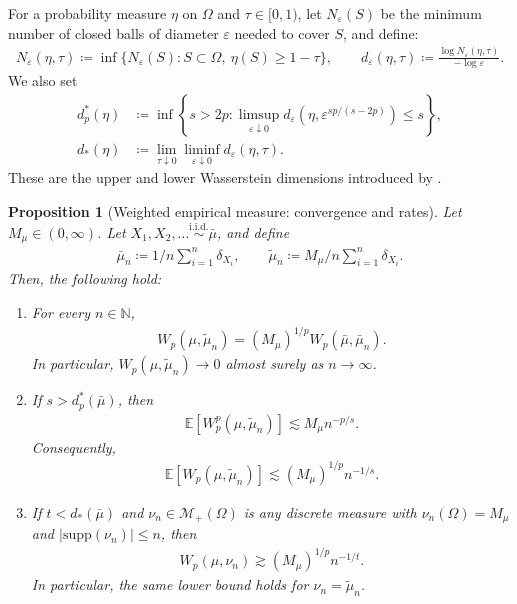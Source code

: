 \documentclass[11pt,reqno]{amsart}
\newtheorem{proposition}[theorem]{Proposition}
\theoremstyle{definition}
\newcommand{\N}{\mathbb{N}}
\renewcommand{\tilde}{\widetilde}
\newcommand{\Ep}{\mathbb{E}}
\newcommand{\mM}{\mathcal{M}}
\renewcommand{\epsilon}{\varepsilon}
\begin{document}
For a probability measure $\eta$ on $\Omega$ and $\tau\in[0,1)$, let $N_\epsilon(S)$ be the minimum number of closed balls of diameter $\epsilon$ needed to cover $S$, and define:
\begin{align}
    N_\epsilon(\eta,\tau) \coloneqq \inf\{N_\epsilon(S): S\subset \Omega,\ \eta(S)\ge 1-\tau\},
    \qquad
    d_\epsilon(\eta,\tau) \coloneqq \frac{\log N_\epsilon(\eta,\tau)}{-\log \epsilon}.
\end{align}
We also set
\begin{align}
    d_p^*(\eta)
    &\coloneqq \inf\left\{ s>2p : \limsup_{\epsilon\downarrow 0} d_\epsilon\left(\eta,\epsilon^{sp/(s-2p)}\right) \le s \right\}, \\
    d_*(\eta)
    &\coloneqq \lim_{\tau\downarrow 0} \liminf_{\epsilon\downarrow 0} d_\epsilon(\eta,\tau).
\end{align}
These are the upper and lower Wasserstein dimensions introduced by \cite{weed2019sharp}.


\begin{proposition}[Weighted empirical measure: convergence and rates]
\label{prop:weighted_empirical_wasserstein}
Let $M_\mu\in(0,\infty)$.
Let $X_1,X_2,\dots \stackrel{\mathrm{i.i.d.}}{\sim} \bar\mu$, and define
\begin{align}
    \bar\mu_n \coloneqq {1/n}\sum_{i=1}^n \delta_{X_i},
    \qquad
    \tilde\mu_n \coloneqq  {M_\mu/n}\sum_{i=1}^n \delta_{X_i}.
\end{align}
Then, the following hold:
\begin{enumerate}[label=(\roman*)]
    \item For every $n\in\N$,
    \begin{align}
        W_p(\mu,\tilde\mu_n) = (M_\mu)^{1/p} W_p(\bar\mu,\bar\mu_n).
    \end{align}
    In particular, $W_p(\mu,\tilde\mu_n)\to 0$ almost surely as $n\to\infty$.

    \item If $s>d_p^*(\bar\mu)$, then
    \begin{align}
    \label{eq:weighted_empirical_wp_power_rate}
        \Ep[W_p^p(\mu,\tilde\mu_n)] \lesssim M_\mu n^{-p/s}.
    \end{align}
    Consequently,
    \begin{align}
        \Ep[W_p(\mu,\tilde\mu_n)] \lesssim (M_\mu)^{1/p} n^{-1/s}.
    \end{align}

    \item If $t<d_*(\bar\mu)$ and $\nu_n\in\mM_+(\Omega)$ is any discrete measure with
    $\nu_n(\Omega)=M_\mu$ and $|\mathrm{supp}(\nu_n)|\le n$, then
    \begin{align}
        W_p(\mu,\nu_n) \gtrsim (M_\mu)^{1/p} n^{-1/t}.
    \end{align}
    In particular, the same lower bound holds for $\nu_n=\tilde\mu_n$.
\end{enumerate}
\end{proposition}
\end{document}
